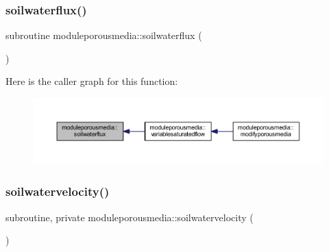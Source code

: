 \subsubsection{\texorpdfstring{soilwaterflux()}{soilwaterflux()}}
{\footnotesize\ttfamily subroutine moduleporousmedia\+::soilwaterflux (\begin{DoxyParamCaption}{ }\end{DoxyParamCaption})\hspace{0.3cm}{\ttfamily [private]}}

Here is the caller graph for this function\+:\nopagebreak
\begin{figure}[H]
\begin{center}
\leavevmode
\includegraphics[width=350pt]{namespacemoduleporousmedia_ad749502c076b86d6579522e1a1377e65_icgraph}
\end{center}
\end{figure}
\mbox{\label{namespacemoduleporousmedia_a717a5b2d4249d602f98474f7a4c24665}} 
\subsubsection{\texorpdfstring{soilwatervelocity()}{soilwatervelocity()}}
{\footnotesize\ttfamily subroutine, private moduleporousmedia\+::soilwatervelocity (\begin{DoxyParamCaption}{ }\end{DoxyParamCaption})\hspace{0.3cm}{\ttfamily [private]}}

